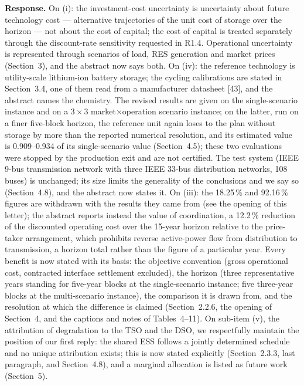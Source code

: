 \documentclass[11pt]{article}
\newcommand{\rresponse}[1]{\noindent\textbf{Response.} #1\par\smallskip}
\begin{document}
\rresponse{
On (i): the investment-cost uncertainty is uncertainty about future technology cost --- alternative trajectories of the unit cost of storage over the horizon --- not about the cost of capital; the cost of capital is treated separately through the discount-rate sensitivity requested in R1.4. Operational uncertainty is represented through scenarios of load, RES generation and market prices (Section~3), and
the abstract now says both. 
On (iv): the reference technology is utility-scale lithium-ion battery storage; the cycling calibrations are stated in Section~3.4, one of them read from a manufacturer datasheet [43], and the abstract names the chemistry. The revised results are given on the single-scenario instance and on a $3\times3$ market$\times$operation scenario instance; 
on the latter, run on a finer five-block horizon, the reference unit again loses to the plan without storage by more than the reported numerical resolution, and its estimated value is 0.909--0.934 of its single-scenario value (Section~4.5); these two evaluations were stopped by the production exit and are not certified. The test system (IEEE 9-bus transmission network with three IEEE 33-bus distribution networks, 108 buses) is unchanged; its size
limits the generality of the conclusions and we say so (Section~4.8), and the abstract now states it.
On (iii): the 18.25\,\% and 92.16\,\% figures are withdrawn with the results they came from (see the opening of this letter); the abstract reports instead the value of coordination, a 12.2\,\% reduction of the discounted operating cost over the 15-year horizon relative to the price-taker arrangement, which prohibits reverse active-power flow from distribution to transmission, a horizon total rather than the figure of a particular year.
Every benefit is now stated with its basis: the objective convention (gross operational cost, contracted interface settlement excluded), the horizon (three representative years standing for five-year blocks at the single-scenario instance; five three-year blocks at the multi-scenario instance), the comparison it is drawn from, and the resolution at which the difference is claimed (Section~2.2.6, the opening of Section~4, and the captions and notes of Tables~4--11).
On sub-item (v), the attribution of degradation to the TSO and the DSO, we respectfully maintain the position of our first reply: the shared ESS follows a jointly determined schedule and no unique attribution exists; this is now stated explicitly (Section~2.3.3, last paragraph, and Section~4.8), and a marginal allocation is listed as future work (Section~5).
}
\end{document}
